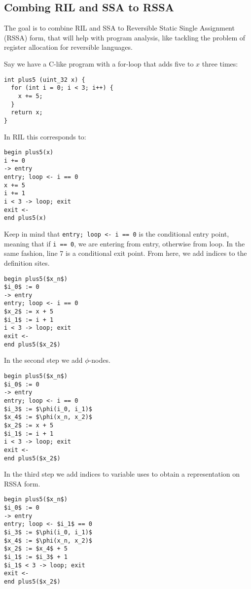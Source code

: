 \subsection{Combing RIL and SSA to RSSA}
The goal is to combine RIL and SSA to Reversible Static Single Assignment (RSSA) form, that will help with program analysis, like tackling the problem of register allocation for reversible languages.

Say we have a C-like program with a for-loop that adds five to $x$ three times:
\begin{lstlisting}
int plus5 (uint_32 x) {
  for (int i = 0; i < 3; i++) {
    x += 5;
  }
  return x;
}
\end{lstlisting}
In RIL this corresponds to:
\begin{lstlisting}[mathescape=true]
begin plus5(x)
i += 0
-> entry
entry; loop <- i == 0
x += 5
i += 1
i < 3 -> loop; exit
exit <-
end plus5(x)
\end{lstlisting}
Keep in mind that \lstinline{entry; loop <- i == 0} is the conditional entry point, meaning that if \lstinline{i == 0}, we are entering from entry, otherwise from loop. In the same fashion, line 7 is a conditional exit point.
From here, we add indices to the definition sites.
\begin{lstlisting}[mathescape=true]
begin plus5($x_n$)
$i_0$ := 0
-> entry
entry; loop <- i == 0
$x_2$ := x + 5
$i_1$ := i + 1
i < 3 -> loop; exit
exit <-
end plus5($x_2$)
\end{lstlisting}
In the second step we add $\phi$-nodes.
\begin{lstlisting}[mathescape=true]
begin plus5($x_n$)
$i_0$ := 0
-> entry
entry; loop <- i == 0
$i_3$ := $\phi(i_0, i_1)$
$x_4$ := $\phi(x_n, x_2)$
$x_2$ := x + 5
$i_1$ := i + 1
i < 3 -> loop; exit
exit <-
end plus5($x_2$)
\end{lstlisting}
In the third step we add indices to variable uses to obtain a representation on RSSA form.
\begin{lstlisting}[mathescape=true]
begin plus5($x_n$)
$i_0$ := 0
-> entry
entry; loop <- $i_1$ == 0
$i_3$ := $\phi(i_0, i_1)$
$x_4$ := $\phi(x_n, x_2)$
$x_2$ := $x_4$ + 5
$i_1$ := $i_3$ + 1
$i_1$ < 3 -> loop; exit
exit <-
end plus5($x_2$)
\end{lstlisting}
